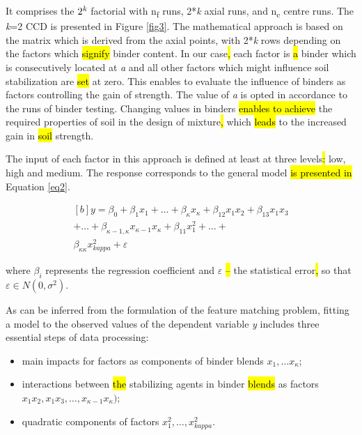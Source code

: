 \documentclass[eprint,
]{actapoly}
\begin{document}
It comprises the $2^\emph{k}$ factorial with n\textsubscript{f} runs, 2*\emph{k} axial runs, and n\textsubscript{c} centre runs. The \emph{k}=2 CCD is presented in Figure \ref{fig3}. The mathematical approach is based on the matrix which is derived from the axial points, with 2*\emph{k} rows depending on the factors which \hl{signify }binder content. In our case\hl{, }each factor is \hl{a }binder which is consecutively located at \emph{a} and all other factors which might influence soil stabilization are \hl{set }at zero. This enables to evaluate the influence of binders as factors controlling the gain of strength. The value of \emph{a} is opted in accordance to the runs of binder testing. Changing values in binders \hl{enables to achieve }the required properties {of soil in }the design of mixture\hl{, }which \hl{leads }to the increased gain in \hl{soil }strength.

The input of each factor in this approach is defined at least at three levels\hl{: }low, high and medium. The response corresponds to the general model \hl{is presented in }Equation \ref{eq2}.

\begin{equation}\label{eq2}
\begin{aligned}[b]
y=\beta_0+\beta_{1}x_{1}+\ldots+\beta_{\kappa}x_{\kappa}+\beta_{12}x_{1}x_{2}+\beta_{13}x_{1}x_3\\
+\ldots+\beta_{\kappa-1,\kappa}x_{\kappa-1}x_{\kappa}+\beta_{11}x_{1}^2+\ldots+ \\\beta_{\kappa\kappa}x_{kappa}^2+\varepsilon
\end{aligned}
\end{equation}

where $\beta_i$ represents the regression coefficient and $\varepsilon$\hl{ -- }the statistical error\hl{, }so that $\varepsilon\in N(0,\sigma^2)$.

As can be inferred from the formulation of the feature matching problem, fitting a model to the observed values of the dependent variable \emph{y} includes three essential steps of data processing: 

\begin{itemize}
	\item main impacts for factors as components of binder blends $x_1, \ldots x_\kappa$;
	\item interactions between \hl{the }stabilizing agents in binder \hl{blends }as factors $x_{1}x_{2}, x_{1}x_{3}, \ldots, x_{\kappa-1}x_{\kappa})$; 
	\item quadratic components of factors $x_{1}^2, \ldots, x_{kappa}^2$. 
\end{itemize}
\end{document}
